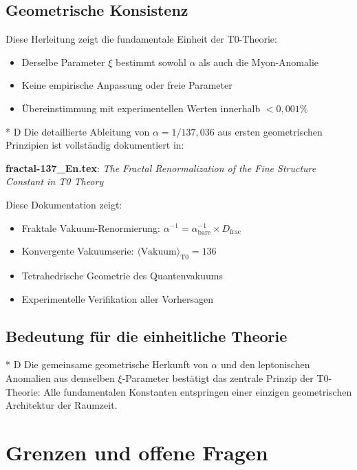 \documentclass[12pt,a4paper]{article}
\theoremstyle{remark}
\begin{document}
\subsection{Geometrische Konsistenz}

Diese Herleitung zeigt die fundamentale Einheit der T0-Theorie:
\begin{itemize}
	\item Derselbe Parameter $\xi$ bestimmt sowohl $\alpha$ als auch die Myon-Anomalie
	\item Keine empirische Anpassung oder freie Parameter
	\item Übereinstimmung mit experimentellen Werten innerhalb $< 0{,}001\%$
\end{itemize}

\begin{important}[title=Vollständige mathematische Herleitung]
	* D Die detaillierte Ableitung von $\alpha = 1/137{,}036$ aus ersten geometrischen Prinzipien ist vollständig dokumentiert in:
	
	\textbf{fractal-137\_En.tex}: \textit{The Fractal Renormalization of the Fine Structure Constant in T0 Theory}
	
	Diese Dokumentation zeigt:
	\begin{itemize}
		\item Fraktale Vakuum-Renormierung: $\alpha^{-1} = \alpha_{\text{bare}}^{-1} \times D_{\text{frac}}$
		\item Konvergente Vakuumserie: $\langle \text{Vakuum} \rangle_{\text{T0}} = 136$
		\item Tetrahedrische Geometrie des Quantenvakuums
		\item Experimentelle Verifikation aller Vorhersagen
	\end{itemize}
\end{important}

\subsection{Bedeutung für die einheitliche Theorie}

* D Die gemeinsame geometrische Herkunft von $\alpha$ und den leptonischen Anomalien aus demselben $\xi$-Parameter bestätigt das zentrale Prinzip der T0-Theorie: Alle fundamentalen Konstanten entspringen einer einzigen geometrischen Architektur der Raumzeit.\section{Grenzen und offene Fragen}
\end{document}
